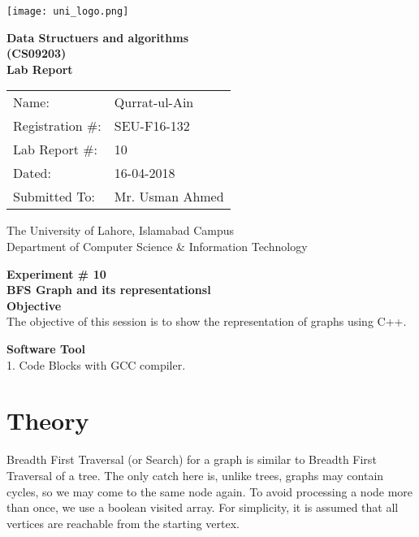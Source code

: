 \documentclass[11pt]{article}            %
\begin{document}
\begin{titlepage}
    \centering
  \vfill
    \texttt{[image: uni\_logo.png]} \\ 
	\vskip2cm
    {\bfseries\Large
	Data Structuers and algorithms \\ (CS09203)\\
	
	\vskip2cm
	Lab Report 
	 
	\vskip2cm
	}    

\begin{center}
\begin{tabular}{ l l  } 

Name: & Qurrat-ul-Ain \\ 
Registration \#: & SEU-F16-132 \\ 
Lab Report \#: & 10 \\ 
 Dated:& 16-04-2018\\ 
Submitted To:& Mr. Usman Ahmed\\ 

\end{tabular}
\end{center}
    \vfill
    The University of Lahore, Islamabad Campus\\
Department of Computer Science \& Information Technology
\end{titlepage}


    
    {\bfseries\Large
\centering
	Experiment \# 10 \\

BFS Graph and its representationsl \\
	
	}    
 \vskip1cm
 \textbf {Objective}\\ The objective of this session is to show the representation of graphs using C++. 
 
 \textbf {Software Tool} \\
 1. Code Blocks with GCC compiler.

\section{Theory }              

Breadth First Traversal (or Search) for a graph is similar to Breadth First Traversal of a tree. The only catch here is, unlike trees, graphs may contain cycles, so we may come to the same node again. To avoid processing a node more than once, we use a boolean visited array. For simplicity, it is assumed that all vertices are reachable from the starting vertex.
\end{document}
